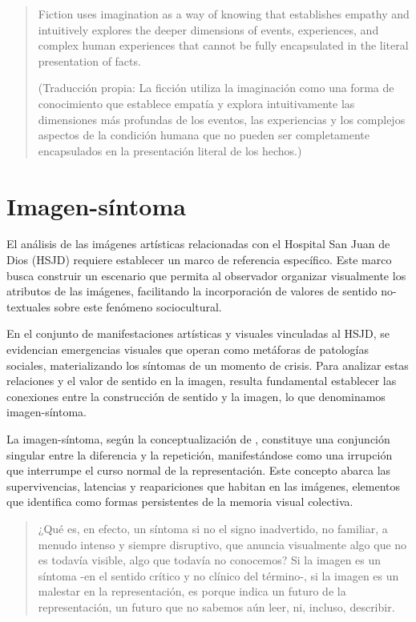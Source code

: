 \begin{quote}
    Fiction uses imagination as a way of knowing that establishes empathy and intuitively explores the deeper dimensions of events, experiences, and complex human experiences that cannot be fully encapsulated in the literal presentation of facts. \parencite[p. 30]{Leavy2018}
    
    \footnotesize
    (Traducción propia: La ficción utiliza la imaginación como una forma de conocimiento que establece empatía y explora intuitivamente las dimensiones más profundas de los eventos, las experiencias y los complejos aspectos de la condición humana que no pueden ser completamente encapsulados en la presentación literal de los hechos.)
    \normalsize
\end{quote}

\section{Imagen-síntoma}

El análisis de las imágenes artísticas relacionadas con el Hospital San Juan de Dios (HSJD) requiere establecer un marco de referencia específico. Este marco busca construir un escenario que permita al observador organizar visualmente los atributos de las imágenes, facilitando la incorporación de valores de sentido no-textuales sobre este fenómeno sociocultural.

En el conjunto de manifestaciones artísticas y visuales vinculadas al HSJD, se evidencian emergencias visuales que operan como metáforas de patologías sociales, materializando los síntomas de un momento de crisis. Para analizar estas relaciones y el valor de sentido en la imagen, resulta fundamental establecer las conexiones entre la construcción de sentido y la imagen, lo que denominamos imagen-síntoma.

La imagen-síntoma, según la conceptualización de \parencite{DidiHuberman2011}, constituye una conjunción singular entre la diferencia y la repetición, manifestándose como una irrupción que interrumpe el curso normal de la representación. Este concepto abarca las supervivencias, latencias y reapariciones que habitan en las imágenes, elementos que \parencite{Warburg2010} identifica como formas persistentes de la memoria visual colectiva.

\begin{quote}
¿Qué es, en efecto, un síntoma si no el signo inadvertido, no familiar, a menudo intenso y siempre disruptivo, que anuncia visualmente algo que no es todavía visible, algo que todavía no conocemos? Si la imagen es un síntoma -en el sentido crítico y no clínico del término-, si la imagen es un malestar en la representación, es porque indica un futuro de la representación, un futuro que no sabemos aún leer, ni, incluso, describir. \parencite[p. 307]{DidiHuberman2011}
\end{quote}

